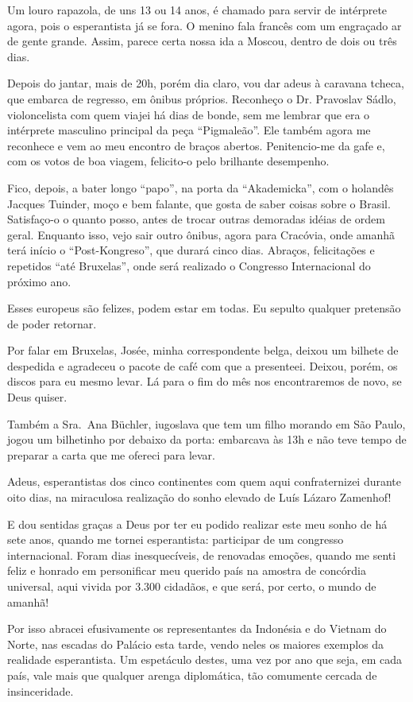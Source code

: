 Um louro rapazola, de uns 13 ou 14 anos, é chamado para servir de intérprete agora, pois o esperantista já se fora. O menino fala francês com um engraçado ar de gente grande. Assim, parece certa nossa ida a Moscou, dentro de dois ou três dias.

Depois do jantar, mais de 20h, porém dia claro, vou dar adeus à caravana tcheca, que embarca de regresso, em ônibus próprios. Reconheço o Dr. Pravoslav Sádlo, violoncelista com quem viajei há dias de bonde, sem me lembrar que era o intérprete masculino principal da peça ``Pigmaleão''. Ele também agora me reconhece e vem ao meu encontro de braços abertos. Penitencio-me da gafe e, com os votos de boa viagem, felicito-o pelo brilhante desempenho.

Fico, depois, a bater longo ``papo'', na porta da ``Akademicka'', com o holandês Jacques Tuinder, moço e bem falante, que gosta de saber coisas sobre o Brasil. Satisfaço-o o quanto posso, antes de trocar outras demoradas idéias de ordem geral. Enquanto isso, vejo sair outro ônibus, agora para Cracóvia, onde amanhã terá início o ``Post-Kongreso'', que durará cinco dias. Abraços, felicitações e repetidos ``até Bruxelas'', onde será realizado o Congresso Internacional do próximo ano.

Esses europeus são felizes, podem estar em todas. Eu sepulto qualquer pretensão de poder retornar.

Por falar em Bruxelas, Josée, minha correspondente belga, deixou um bilhete de despedida e agradeceu o pacote de café com que a presenteei. Deixou, porém, os discos para eu mesmo levar. Lá para o fim do mês nos encontraremos de novo, se Deus quiser.

Também a Sra.~Ana Büchler, iugoslava que tem um filho morando em São Paulo, jogou um bilhetinho por debaixo da porta: embarcava às 13h e não teve tempo de preparar a carta que me ofereci para levar.

Adeus, esperantistas dos cinco continentes com quem aqui confraternizei durante oito dias, na miraculosa realização do sonho elevado de Luís Lázaro Zamenhof!

E dou sentidas graças a Deus por ter eu podido realizar este meu sonho de há sete anos, quando me tornei esperantista: participar de um congresso internacional. Foram dias inesquecíveis, de renovadas emoções, quando me senti feliz e honrado em personificar meu querido país na amostra de concórdia universal, aqui vivida por 3.300 cidadãos, e que será, por certo, o mundo de amanhã!

Por isso abracei efusivamente os representantes da Indonésia e do Vietnam do Norte, nas escadas do Palácio esta tarde, vendo neles os maiores exemplos da realidade esperantista. Um espetáculo destes, uma vez por ano que seja, em cada país, vale mais que qualquer arenga diplomática, tão comumente cercada de insinceridade.

